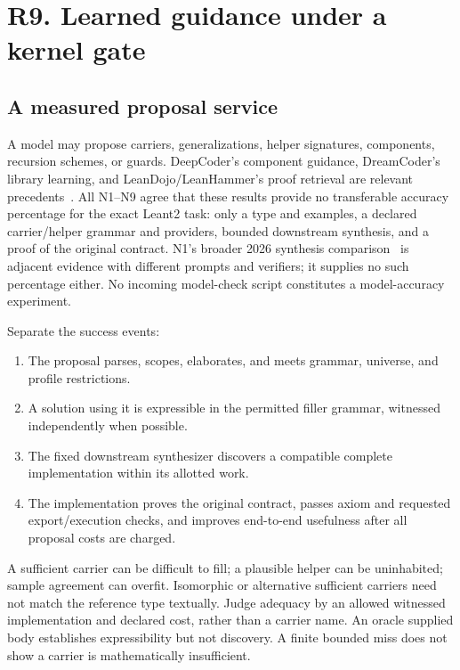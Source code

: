 \section{R9. Learned guidance under a kernel gate}\label{sec:learning}

\subsection{A measured proposal service}\label{sec:learning-measurement}

A model may propose carriers, generalizations, helper signatures, components, recursion schemes, or guards. DeepCoder's component guidance, DreamCoder's library learning, and LeanDojo/LeanHammer's proof retrieval are relevant precedents~\cite{deepcoder,dreamcoder,leandojo,leanhammer}. All N1--N9 agree that these results provide no transferable accuracy percentage for the exact Leant2 task: only a type and examples, a declared carrier/helper grammar and providers, bounded downstream synthesis, and a proof of the original contract. N1's broader 2026 synthesis comparison~\cite{llmsynthesis} is adjacent evidence with different prompts and verifiers; it supplies no such percentage either. No incoming model-check script constitutes a model-accuracy experiment.

Separate the success events:
\begin{enumerate}
\item The proposal parses, scopes, elaborates, and meets grammar, universe, and profile restrictions.
\item A solution using it is expressible in the permitted filler grammar, witnessed independently when possible.
\item The fixed downstream synthesizer discovers a compatible complete implementation within its allotted work.
\item The implementation proves the original contract, passes axiom and requested export/execution checks, and improves end-to-end usefulness after all proposal costs are charged.
\end{enumerate}
A sufficient carrier can be difficult to fill; a plausible helper can be uninhabited; sample agreement can overfit. Isomorphic or alternative sufficient carriers need not match the reference type textually. Judge adequacy by an allowed witnessed implementation and declared cost, rather than a carrier name. An oracle supplied body establishes expressibility but not discovery. A finite bounded miss does not show a carrier is mathematically insufficient.


